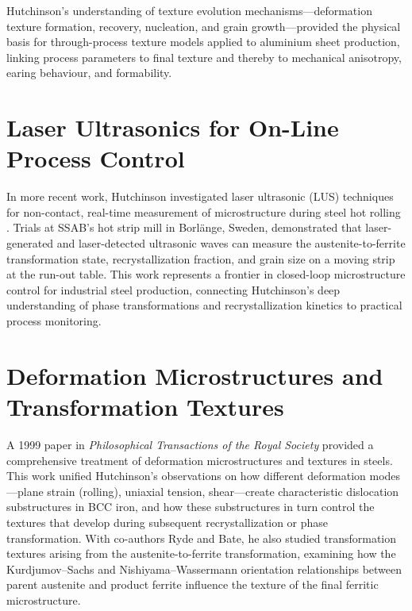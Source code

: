 \documentclass[11pt,a4paper]{article}
\begin{document}
Hutchinson's understanding of texture evolution mechanisms---deformation
texture formation, recovery, nucleation, and grain growth---provided the
physical basis for through-process texture models applied to aluminium
sheet production, linking process parameters to final texture and
thereby to mechanical anisotropy, earing behaviour, and formability.

\section{Laser Ultrasonics for On-Line Process Control}
\label{sec:lus}

In more recent work, Hutchinson investigated laser ultrasonic (LUS)
techniques for non-contact, real-time measurement of microstructure
during steel hot rolling \cite{Hutchinson2011LUS}.  Trials at SSAB's hot
strip mill in Borl\"ange, Sweden, demonstrated that laser-generated and
laser-detected ultrasonic waves can measure the austenite-to-ferrite
transformation state, recrystallization fraction, and grain size on a
moving strip at the run-out table.  This work represents a frontier in
closed-loop microstructure control for industrial steel production,
connecting Hutchinson's deep understanding of phase transformations and
recrystallization kinetics to practical process monitoring.

\section{Deformation Microstructures and Transformation Textures}
\label{sec:deformation}

A 1999 paper in \emph{Philosophical Transactions of the Royal Society}
\cite{Hutchinson1999Phil} provided a comprehensive treatment of
deformation microstructures and textures in steels.  This work unified
Hutchinson's observations on how different deformation modes---plane
strain (rolling), uniaxial tension, shear---create characteristic
dislocation substructures in BCC iron, and how these substructures in
turn control the textures that develop during subsequent
recrystallization or phase transformation.  With co-authors Ryde and
Bate, he also studied transformation textures arising from the
austenite-to-ferrite transformation, examining how the
Kurdjumov--Sachs and Nishiyama--Wassermann orientation relationships
between parent austenite and product ferrite influence the texture of
the final ferritic microstructure.
\end{document}
